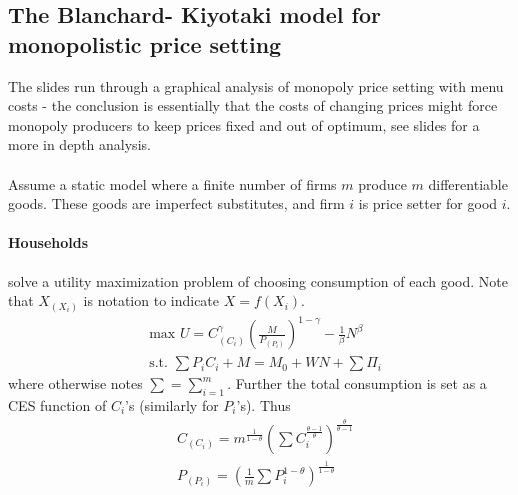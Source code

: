 \documentclass[12pt, a4paper]{article}
\begin{document}
\begin{spacing}{1.213}
\subsection{The Blanchard- Kiyotaki model for monopolistic price setting}
The slides run through a graphical analysis of monopoly price setting with menu costs - the conclusion is essentially that the costs of changing prices might force monopoly producers to keep prices fixed and out of optimum, see slides for a more in depth analysis.
\\ \\
Assume a static model where a finite number of firms $m$ produce $m$ differentiable goods. These goods are imperfect substitutes, and firm $i$ is price setter for good $i$.

\paragraph{Households} solve a utility maximization problem of choosing consumption of each good. Note that $X_{(X_i)}$ is notation to indicate $X=f(X_i)$.
\begin{align*}
&\textrm{max } U = C_{(C_i)}^{\gamma} \left( \frac{M}{P_{(P_i)}} \right)^{1-\gamma} - \frac{1}{\beta}N^{\beta} \\
& \textrm{s.t. } \sum P_i C_i + M = M_0 + WN + \sum \Pi_i
\end{align*}
where otherwise notes $\sum = \sum_{i=1}^m$. Further the total consumption is set as a CES function of $C_i$'s (similarly for $P_i$'s). Thus
\begin{align*}
&C_{(C_i)} = m^{\frac{1}{1-\theta}} \left( \sum C_i^{\frac{\theta-1}{\theta}} \right)^{\frac{\theta}{\theta -1}} \\
& P_{(P_i)} = \left( \frac{1}{m} \sum P_i^{1-\theta} \right)^{\frac{1}{1-\theta}}
\end{align*}


\end{spacing}
\end{document}
